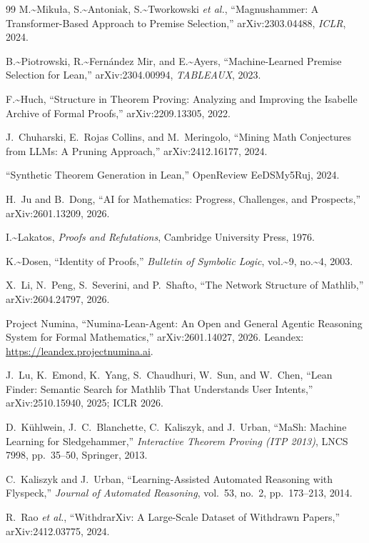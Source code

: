 \documentclass{article}
\theoremstyle{remark}
\begin{document}
\begin{thebibliography}{99}
M.\textasciitilde{}Miku{\l}a, S.\textasciitilde{}Antoniak, S.\textasciitilde{}Tworkowski \emph{et al.}, ``Magnushammer: A Transformer-Based Approach to Premise Selection,''
arXiv:2303.04488, \emph{ICLR}, 2024.

B.\textasciitilde{}Piotrowski, R.\textasciitilde{}Fern\'andez Mir, and E.\textasciitilde{}Ayers, ``Machine-Learned Premise Selection for Lean,''
arXiv:2304.00994, \emph{TABLEAUX}, 2023.

F.\textasciitilde{}Huch, ``Structure in Theorem Proving: Analyzing and Improving the Isabelle Archive of Formal Proofs,''
arXiv:2209.13305, 2022.

J.~Chuharski, E.~Rojas Collins, and M.~Meringolo,
``Mining Math Conjectures from LLMs: A Pruning Approach,''
arXiv:2412.16177, 2024.

``Synthetic Theorem Generation in Lean,''
OpenReview EeDSMy5Ruj, 2024.

H.~Ju and B.~Dong, ``AI for Mathematics: Progress, Challenges, and Prospects,''
arXiv:2601.13209, 2026.

I.\textasciitilde{}Lakatos, \emph{Proofs and Refutations}, Cambridge University Press, 1976.

K.\textasciitilde{}Dosen, ``Identity of Proofs,''
\emph{Bulletin of Symbolic Logic}, vol.\textasciitilde{}9, no.\textasciitilde{}4, 2003.

X.~Li, N.~Peng, S.~Severini, and P.~Shafto, ``The Network Structure of Mathlib,''
arXiv:2604.24797, 2026.

Project Numina, ``Numina-Lean-Agent: An Open and General Agentic Reasoning
System for Formal Mathematics,'' arXiv:2601.14027, 2026.
Leandex: \url{https://leandex.projectnumina.ai}.

J.~Lu, K.~Emond, K.~Yang, S.~Chaudhuri, W.~Sun, and W.~Chen,
``Lean Finder: Semantic Search for Mathlib That Understands User Intents,''
arXiv:2510.15940, 2025; ICLR 2026.

D.~K\"uhlwein, J.~C.~Blanchette, C.~Kaliszyk, and J.~Urban,
``MaSh: Machine Learning for Sledgehammer,''
\emph{Interactive Theorem Proving (ITP 2013)}, LNCS 7998, pp.~35--50, Springer, 2013.

C.~Kaliszyk and J.~Urban, ``Learning-Assisted Automated Reasoning with Flyspeck,''
\emph{Journal of Automated Reasoning}, vol.~53, no.~2, pp.~173--213, 2014.


R.~Rao \emph{et al.}, ``WithdrarXiv: A Large-Scale Dataset of Withdrawn Papers,''
arXiv:2412.03775, 2024.

\end{thebibliography}
\end{document}
